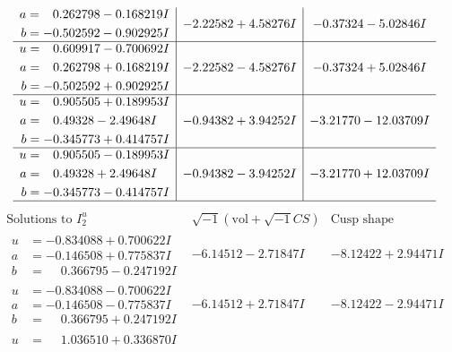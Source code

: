\documentclass[1p]{elsarticle_modified}
\theoremstyle{definition}
\newcommand{\I}{\sqrt{-1}}
\begin{document}
$$\begin{array}{c|c|c}
\begin{aligned}
a &= \phantom{-}0.262798 - 0.168219 I \\
b &= -0.502592 - 0.902925 I\end{aligned}
 & -2.22582 + 4.58276 I & -0.37324 - 5.02846 I \\ \hline\begin{aligned}
u &= \phantom{-}0.609917 - 0.700692 I \\
a &= \phantom{-}0.262798 + 0.168219 I \\
b &= -0.502592 + 0.902925 I\end{aligned}
 & -2.22582 - 4.58276 I & -0.37324 + 5.02846 I \\ \hline\begin{aligned}
u &= \phantom{-}0.905505 + 0.189953 I \\
a &= \phantom{-}0.49328 - 2.49648 I \\
b &= -0.345773 + 0.414757 I\end{aligned}
 & -0.94382 + 3.94252 I & -3.21770 - 12.03709 I \\ \hline\begin{aligned}
u &= \phantom{-}0.905505 - 0.189953 I \\
a &= \phantom{-}0.49328 + 2.49648 I \\
b &= -0.345773 - 0.414757 I\end{aligned}
 & -0.94382 - 3.94252 I & -3.21770 + 12.03709 I\\
 \hline 
 \end{array}$$\newpage$$\begin{array}{c|c|c}  
\text{Solutions to }I^u_{2}& \I (\text{vol} + \sqrt{-1}CS) & \text{Cusp shape}\\
 \hline 
\begin{aligned}
u &= -0.834088 + 0.700622 I \\
a &= -0.146508 + 0.775837 I \\
b &= \phantom{-}0.366795 - 0.247192 I\end{aligned}
 & -6.14512 - 2.71847 I & -8.12422 + 2.94471 I \\ \hline\begin{aligned}
u &= -0.834088 - 0.700622 I \\
a &= -0.146508 - 0.775837 I \\
b &= \phantom{-}0.366795 + 0.247192 I\end{aligned}
 & -6.14512 + 2.71847 I & -8.12422 - 2.94471 I \\ \hline\begin{aligned}
u &= \phantom{-}1.036510 + 0.336870 I \\

\end{aligned}
\end{array}$$
\end{document}
